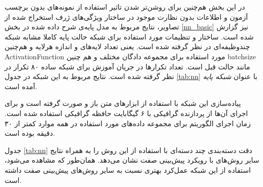 در این بخش هم‌چنین برای روشن‌تر شدن تاثیر استفاده از نمونه‌های بدون برچسب آزمون و اطلاعات بدون نظارت موجود در ساختار ویژگی‌های ژرف استخراج شده از تصاویر، نتایج مربوط به مدل پایه‌ی شرح داده شده در بخش
\ref{nn_basic}
نیز گزارش شده است. ساختار و تنظیمات مورد استفاده برای شبکه حالت پایه کاملا مشابه شبکه چندوظیفه‌ای در نظر گرفته شده است. یعنی تعداد لایه‌های و اندازه هرلایه و هم‌چنین
\gls{ActivationFunction}
مورد استفاده برای مجموعه دادگان مختلف و هم چنین
\gls{batchsize}
مانند حالت قبل است. تعداد تکرارها در جریان آموزش برای شبکه ساده ۸۰ تکرار در نظر گرفته شده است. نتایج مربوط به این شبکه در جدول \ref{tab:nn} با عنوان
\textit{ شبکه پایه}
آمده است.


 پیاده‌سازی این شبکه با استفاده از ابزارهای متن باز
 \cite{theano}
و
  \cite{keras}
صورت گرفته است و برای اجرای آن‌ها از پردازنده گرافیکی
با ۶ گیگابایت حافظه گرافیکی
استفاده شده است.
 زمان اجرای الگوریتم برای مجموعه داده‌های مورد استفاده در همه موارد کمتر از ۳۰ دقیقه بوده است.


جدول \ref{tab:nn} دقت دسته‌بندی چند دسته‌ای با استفاده از این روش را به همراه نتایج سایر روش‌های با رویکرد پیش‌بینی صفت نشان می‌دهد. همان‌طور که مشاهده می‌شود، استفاده از این شبکه عمل‌کرد بهتری نسبت به سایر روش‌های پیش‌بینی صفت داشته است.

